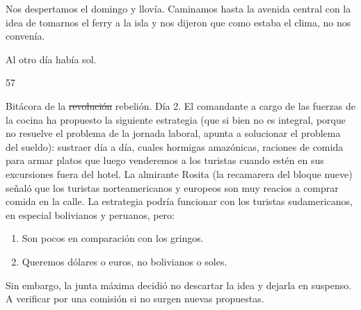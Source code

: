 \documentclass[12pt,twoside,openright,a5paper]{book}
\begin{document}
\nopagebreak

\vspace{0.5cm}

\nopagebreak

Nos despertamos el domingo y llovía. Caminamos hasta la avenida central
con la idea de tomarnos el ferry a la isla y nos dijeron que como estaba
el clima, no nos convenía.

Al otro día había sol.


\vspace{0.5cm}
\afterpage{}
\hrulefill \hspace{0.1cm}\decofourleft\hspace{0.2cm} 57 \hspace{0.2cm}\decofourright \hspace{0.1cm}\hrulefill

\nopagebreak

\vspace{0.5cm}

\nopagebreak

Bitácora de la \st{revolución} rebelión. Día 2. El comandante a cargo de las fuerzas de
la cocina ha propuesto la siguiente estrategia (que si bien no es integral,
porque no resuelve el problema de la jornada laboral, apunta a solucionar
el problema del sueldo): sustraer día a día, cuales hormigas amazónicas,
raciones de comida para armar platos que luego venderemos a los turistas
cuando estén en sus excursiones fuera del hotel. La almirante Rosita
(la recamarera del bloque nueve) señaló que los turistas norteamericanos
y europeos son muy reacios a comprar comida en la calle. La estrategia
podría funcionar con los turistas sudamericanos, en especial bolivianos
y peruanos, pero:

\begin{enumerate}
\item Son pocos en comparación con los gringos.
\item Queremos dólares o euros, no bolivianos o soles.
\end{enumerate}

Sin embargo, la junta máxima decidió no descartar la idea y dejarla en
suspenso. A verificar por una comisión si no surgen nuevas propuestas.

\vspace{0.5cm}
\end{document}

